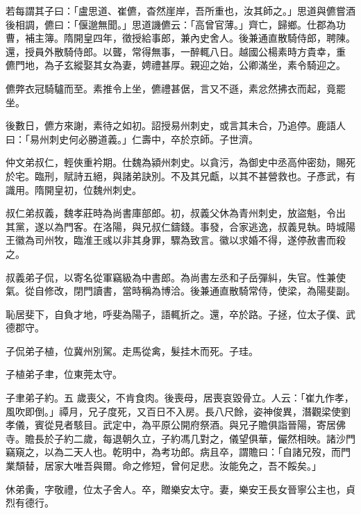 \begin{pinyinscope}
 若每謂其子曰：「盧思道、崔儦，杳然崖岸，吾所重也，汝其師之。」思道與儦嘗酒後相調，儦曰：「偃邈無聞。」思道譏儦云：「高曾官薄。」齊亡，歸鄉。仕郡為功曹，補主簿。隋開皇四年，徵授給事郎，兼內史舍人。後兼通直散騎侍郎，聘陳。還，授員外散騎侍郎。以聾，常得無事，一醉輒八日。越國公楊素時方貴幸，重
 儦門地，為子玄縱娶其女為妻，娉禮甚厚。親迎之始，公卿滿坐，素令騎迎之。



 儦弊衣冠騎驢而至。素推令上坐，儦禮甚倨，言又不遜，素忿然拂衣而起，竟罷坐。



 後數日，儦方來謝，素待之如初。詔授易州刺史，或言其未合，乃追停。鹿語人曰：「易州刺史何必勝道義。」仁壽中，卒於京師。子世濟。



 仲文弟叔仁，輕俠重衿期。仕魏為潁州刺史。以貪污，為御史中丞高仲密劾，賜死於宅。臨刑，賦詩五絕，與諸弟訣別。不及其兄甗，以其不甚營救也。子彥武，有識用。隋開皇初，位魏州刺史。



 叔仁弟叔義，魏孝莊時為尚書庫部郎。初，叔義父休為青州刺史，放盜魁，令出
 其黨，遂以為門客。在洛陽，與兄叔仁鑄錢。事發，合家逃逸，叔義見執。時城陽王徽為司州牧，臨淮王彧以非其身罪，驟為致言。徽以求婚不得，遂停赦書而殺之。



 叔義弟子侃，以寄名從軍竊級為中書郎。為尚書左丞和子岳彈糾，失官。性兼使氣。從自修改，閉門讀書，當時稱為博洽。後兼通直散騎常侍，使梁，為陽斐副。



 恥居斐下，自負才地，呼斐為陽子，語輒折之。還，卒於路。子拯，位太子僕、武德郡守。



 子侃弟子植，位冀州別駕。走馬從禽，髮挂木而死。子珪。



 子植弟子聿，位東莞太守。



 子聿弟子約。五
 歲喪父，不肯食肉。後喪母，居喪哀毀骨立。人云：「崔九作孝，風吹即倒。」禫月，兄子度死，又百日不入房。長八尺餘，姿神俊異，潛觀梁使劉孝儀，賓從見者駭目。武定中，為平原公開府祭酒。與兄子贍俱詣晉陽，寄居佛寺。贍長於子約二歲，每退朝久立，子約馮几對之，儀望俱華，儼然相映。諸沙門竊窺之，以為二天人也。乾明中，為考功郎。病且卒，謂贍曰：「自諸兄歿，而門業頹替，居家大唯吾與爾。命之修短，曾何足悲。汝能免之，吾不餒矣。」



 休弟夤，字敬禮，位太子舍人。卒，贈樂安太守。妻，樂安王長女晉寧公主也，貞烈有德行。




\end{pinyinscope}
